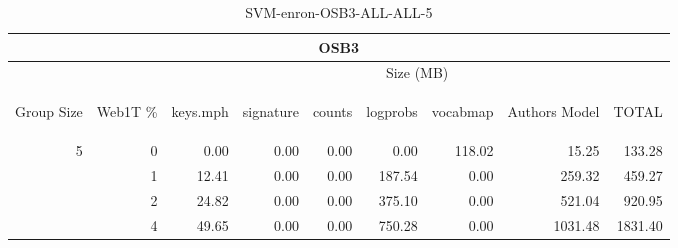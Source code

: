 \begin{center}
\begin{table}[htbp] 
 \begin{center}
\begin{tabular}{ | r | r | r | r | r | r | r | r | r |}
\hline
\multicolumn{9}{|c|}{OSB3}\\
\hline
 & & \multicolumn{7}{|c|}{Size (MB)}\\ \cline{3-9}
\begin{sideways}Group Size\end{sideways} & \begin{sideways}Web1T \% \end{sideways} & \begin{sideways}keys.mph\end{sideways} & \begin{sideways}signature\end{sideways} & \begin{sideways}counts\end{sideways} & \begin{sideways}logprobs\end{sideways} & \begin{sideways}vocabmap\end{sideways} & \begin{sideways}Authors Model \end{sideways} & \begin{sideways}TOTAL\end{sideways}\\
\hline
\multirow{3}{*}{5}
 & 0 & 0.00 & 0.00 & 0.00 & 0.00 & 118.02 & 15.25 & 133.28\\ \cline{2-9}
 & 1 & 12.41 & 0.00 & 0.00 & 187.54 & 0.00 & 259.32 & 459.27\\ \cline{2-9}
 & 2 & 24.82 & 0.00 & 0.00 & 375.10 & 0.00 & 521.04 & 920.95\\ \cline{2-9}
 & 4 & 49.65 & 0.00 & 0.00 & 750.28 & 0.00 & 1031.48 & 1831.40\\ \cline{2-9}
\hline
\end{tabular}
\caption{SVM-enron-OSB3-ALL-ALL-5}
\label{table:SVM-enron-OSB3-ALL-ALL-5}
\end{center}
 \end{table}
\end{center}

